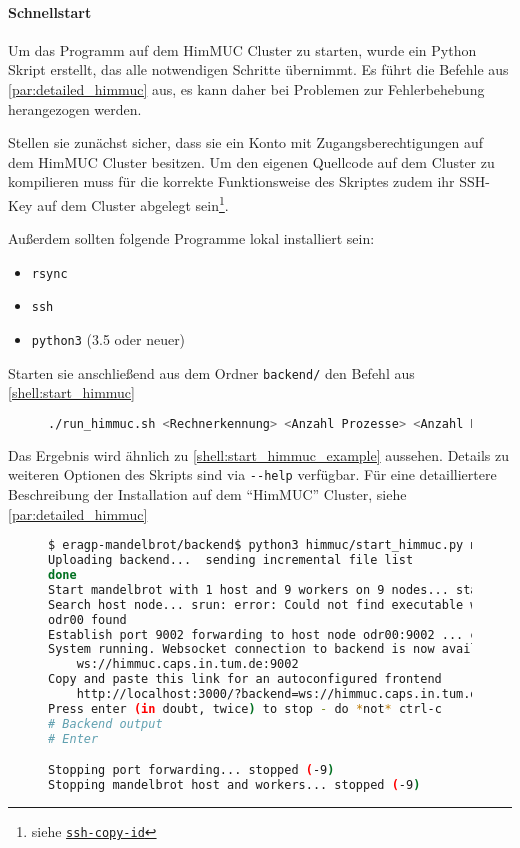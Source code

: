 \paragraph{Schnellstart}

Um das Programm auf dem HimMUC Cluster zu starten, wurde ein
Python Skript erstellt, das alle notwendigen Schritte übernimmt.
Es führt die Befehle aus \autoref{par:detailed_himmuc} aus, es kann daher bei Problemen zur Fehlerbehebung herangezogen werden.

Stellen sie zunächst sicher, dass sie ein Konto mit Zugangsberechtigungen auf dem HimMUC Cluster besitzen.
Um den eigenen Quellcode auf dem Cluster zu kompilieren muss für die korrekte Funktionsweise des Skriptes zudem
ihr SSH-Key auf dem Cluster abgelegt sein\footnote{siehe \href{https://www.ssh.com/ssh/copy-id}{\texttt{ssh-copy-id}}}.

Außerdem sollten folgende Programme lokal installiert sein:
\begin{itemize}
	\item \verb|rsync|
	\item \verb|ssh|
	\item \verb|python3| (3.5 oder neuer)
\end{itemize}

Starten sie anschließend aus dem Ordner \verb|backend/| den Befehl aus \autoref{shell:start_himmuc}

\begin{figure}[h!]
	\begin{lstlisting}[language=bash, caption={Start des Backends auf dem HimMUC}, label={shell:start_himmuc}]
./run_himmuc.sh <Rechnerkennung> <Anzahl Prozesse> <Anzahl Rechenknoten> 
    \end{lstlisting}
\end{figure}

Das Ergebnis wird ähnlich zu \autoref{shell:start_himmuc_example} aussehen.
Details zu weiteren Optionen des Skripts sind via \verb|--help| verfügbar.
Für eine detailliertere Beschreibung der Installation auf dem \enquote{HimMUC} Cluster,
siehe \autoref{par:detailed_himmuc}

\begin{figure}
	\begin{lstlisting}[language=bash, caption={Beispielausgabe bei Start der Entwicklungsumbegung auf dem HimMUC}, label={shell:start_himmuc_example}]
$ eragp-mandelbrot/backend$ python3 himmuc/start_himmuc.py muendler 10 9
Uploading backend...  sending incremental file list
done
Start mandelbrot with 1 host and 9 workers on 9 nodes... started mandelbrot
Search host node... srun: error: Could not find executable worker
odr00 found
Establish port 9002 forwarding to host node odr00:9002 ... established
System running. Websocket connection to backend is now available at
	ws://himmuc.caps.in.tum.de:9002
Copy and paste this link for an autoconfigured frontend
	http://localhost:3000/?backend=ws://himmuc.caps.in.tum.de:9002
Press enter (in doubt, twice) to stop - do *not* ctrl-c
# Backend output
# Enter

Stopping port forwarding... stopped (-9)
Stopping mandelbrot host and workers... stopped (-9)
    \end{lstlisting}
\end{figure}

